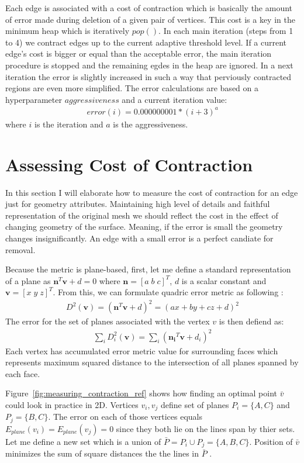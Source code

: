 Each edge is associated with a cost of contraction which is basically the amount of error made during deletion of a given pair of vertices. This cost is a key in the minimum heap \cite{cormen01} which is iteratively $pop()$. In each main iteration (steps from 1 to 4) we contract edges up to the current adaptive threshold level. If a current edge's cost is bigger or equal than the acceptable error, the main iteration procedure is stopped and the remaining egdes in the heap are ignored. In a next iteration the error is slightly increased in such a way that perviously contracted regions are even more simplified. The error calculations are based on a hyperparameter $aggressiveness$ and a current iteration value:
\begin{align}
error(i)=0.000000001*(i+3)^a
\end{align}
where $i$ is the iteration and $a$ is the aggressiveness.

\section{Assessing Cost of Contraction}
In this section I will elaborate how to measure the cost of contraction for an edge just for geometry attributes. Maintaining high level of details and faithful representation of the original mesh we should reflect the cost in the effect of changing geometry of the surface. Meaning, if the error is small the geometry changes insignificantly. An edge with a small error is a perfect candiate for removal.

Because the metric is plane-based, first, let me define a standard representation of a plane as $\mathbf{n}^T\mathbf{v}+d=0$ where $\mathbf{n} = [a\;b\;c]^T$, $d$ is a scalar constant and $\mathbf{v} = [x\;y\;z]^T$. From this, we can formulate quadric error metric as following \cite{garland99}:
\begin{align}
D^2(\mathbf{v}) = (\mathbf{n}^T\mathbf{v}+d)^2 = (ax + by + cz + d)^2
\label{quadric_distance}
\end{align}
The error for the set of planes associated with the vertex $v$ is then defiend as:
\begin{align}
\sum_{i} D_i^2(\mathbf{v}) = \sum_{i} (\mathbf{n_i}^T\mathbf{v}+d_i)^2
\end{align}
Each vertex has accumulated error metric value for surrounding faces  which represents maximum squared distance to the intersection of all planes spanned by each face.

Figure~\ref{fig:measuring_contraction_ref} shows how finding an optimal point $\bar{v}$ could look in practice in 2D. Vertices $v_i, v_j$ define set of planes $P_i = \{A,C\}$ and $P_j = \{B, C\}$. The error on each of those vertices equals $E_{plane}(v_i) = E_{plane}(v_j) = 0$ since they both lie on the lines span by thier sets. Let me define a new set which is a union of $ \bar{P} = P_i \cup P_j = \{ A,B,C \}$. Position of $\bar{v}$ minimizes the sum of square distances the the lines in $\bar{P}$ \cite{garland99}.

